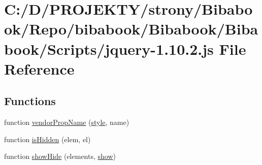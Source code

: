 \hypertarget{_bibabook_2_scripts_2jquery-1_810_82_8js}{}\section{C\+:/\+D/\+P\+R\+O\+J\+E\+K\+T\+Y/strony/\+Bibabook/\+Repo/bibabook/\+Bibabook/\+Bibabook/\+Scripts/jquery-\/1.10.2.js File Reference}
\label{_bibabook_2_scripts_2jquery-1_810_82_8js}
\subsection*{Functions}
\begin{DoxyCompactItemize}
\item 
function \hyperlink{_bibabook_2_scripts_2jquery-1_810_82_8js_a6a111234d6e26ce833f8fabd50819b7a}{vendor\+Prop\+Name} (\hyperlink{jquery-1_810_82-vsdoc_8js_af3f76f18e38dd06c0a345ede43abb420}{style}, name)
\item 
function \hyperlink{_bibabook_2_scripts_2jquery-1_810_82_8js_a67ed58d688ff11991ca2826ebfbf28a4}{is\+Hidden} (elem, el)
\item 
function \hyperlink{_bibabook_2_scripts_2jquery-1_810_82_8js_a002b8e481f3ab2a83194366aceb7a706}{show\+Hide} (elements, \hyperlink{jquery-1_810_82-vsdoc_8js_a8dcdb81268297f0ecf76be5e6aebd05c}{show})
\item 

\end{DoxyCompactItemize}
